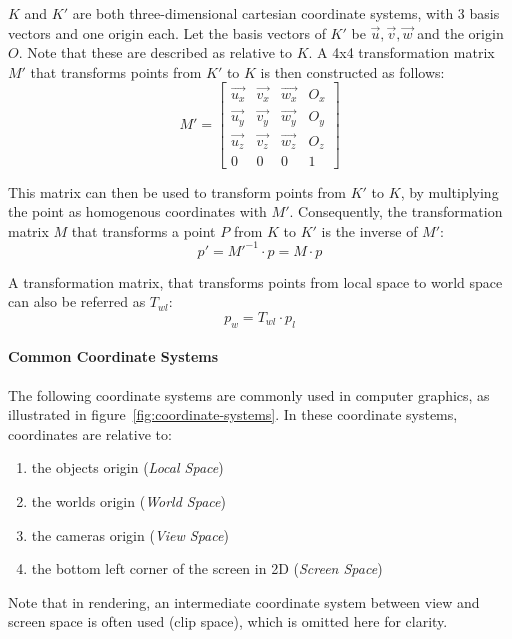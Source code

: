 $K$ and $K'$ are both three-dimensional cartesian coordinate systems, with 3 basis vectors and one origin each.
Let the basis vectors of $K'$ be $\vec{u}, \vec{v}, \vec{w}$ and the origin $O$.
Note that these are described as relative to $K$.
A 4x4 transformation matrix $M'$ that transforms points from $K'$ to $K$ is then constructed as follows:
\begin{equation}
    M' = \begin{bmatrix}
             \vec{u_x} & \vec{v_x} & \vec{w_x} & O_x \\
             \vec{u_y} & \vec{v_y} & \vec{w_y} & O_y \\
             \vec{u_z} & \vec{v_z} & \vec{w_z} & O_z \\
             0         & 0         & 0         & 1
    \end{bmatrix}
\end{equation}

This matrix can then be used to transform points from $K'$ to $K$, by multiplying the point as homogenous coordinates with $M'$.
Consequently, the transformation matrix $M$ that transforms a point $P$ from $K$ to $K'$ is the inverse of $M'$:
\begin{equation}
    p' = M'^{-1} \cdot p = M\cdot p
\end{equation}

A transformation matrix, that transforms points from local space to world space can also be referred as $T_{wl}$:
\begin{equation}
    p_w = T_{wl} \cdot p_l
\end{equation}

\paragraph{Common Coordinate Systems}\label{sec:coordinate-systems}
The following coordinate systems are commonly used in computer graphics, as illustrated in figure~\ref{fig:coordinate-systems}.
In these coordinate systems, coordinates are relative to:
\begin{enumerate}
    \item the objects origin (\textit{Local Space})
    \item the worlds origin (\textit{World Space})
    \item the cameras origin (\textit{View Space})
    \item the bottom left corner of the screen in 2D (\textit{Screen Space})
\end{enumerate}
Note that in rendering, an intermediate coordinate system between view and screen space is often used (clip space),
which is omitted here for clarity.

